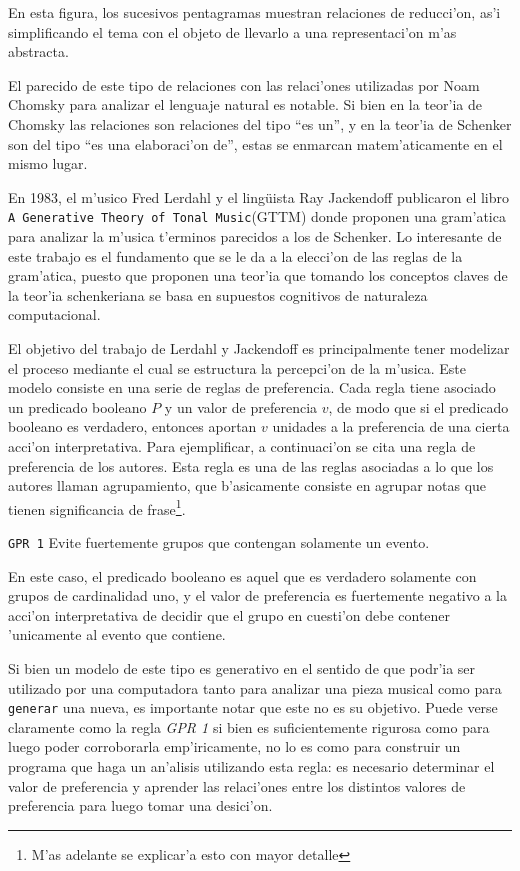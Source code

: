 En esta figura, los sucesivos pentagramas muestran relaciones de reducci'on, as'i simplificando el tema con el objeto de llevarlo a una representaci'on m'as abstracta.

El parecido de este tipo de relaciones con las relaci'ones utilizadas por Noam Chomsky para analizar el lenguaje natural es notable. 
Si bien en la teor'ia de Chomsky las relaciones son relaciones del tipo ``es un'', y en la teor'ia de Schenker son del tipo ``es una elaboraci'on de'', 
estas se enmarcan matem'aticamente en el mismo lugar.  

En 1983, el m'usico Fred Lerdahl y el ling\"uista Ray Jackendoff publicaron el libro 
\texttt{A Generative Theory of Tonal Music}(GTTM) donde proponen una gram'atica para analizar la m'usica t'erminos parecidos a los de Schenker. 
Lo interesante de este trabajo es el fundamento que se le da a la elecci'on de las reglas de la gram'atica, puesto que proponen una teor'ia que tomando los conceptos claves
de la teor'ia schenkeriana se basa en supuestos cognitivos de naturaleza computacional.

El objetivo del trabajo de Lerdahl y Jackendoff es principalmente tener modelizar el proceso mediante el cual se estructura la percepci'on de la m'usica. 
Este modelo consiste en una serie de reglas de preferencia. Cada regla tiene asociado un predicado booleano $P$ y un valor de preferencia $v$, 
de modo que si el predicado booleano es verdadero, entonces aportan $v$ unidades a la preferencia de una cierta acci'on interpretativa. Para ejemplificar, a continuaci'on se cita
una regla de preferencia de los autores. Esta regla es una de las reglas asociadas a lo que los autores llaman agrupamiento, que b'asicamente consiste en agrupar notas que tienen
significancia de frase\footnote{M'as adelante se explicar'a esto con mayor detalle}.
\newline

\begin{center}
\texttt{GPR 1} Evite fuertemente grupos que contengan solamente un evento.
\end{center}

En este caso, el predicado booleano es aquel que es verdadero solamente con grupos de cardinalidad uno, y el valor de preferencia es fuertemente negativo a la acci'on interpretativa
de decidir que el grupo en cuesti'on debe contener 'unicamente al evento que contiene. 

Si bien un modelo de este tipo es generativo en el sentido de que podr'ia ser utilizado por una computadora tanto para analizar una pieza musical como para 
\texttt{generar} una nueva, es importante notar que este no es su objetivo. 
Puede verse claramente como la regla \emph{GPR 1} si bien es suficientemente rigurosa como para luego poder corroborarla emp'iricamente, no lo es como para construir un 
programa que haga un an'alisis utilizando esta regla: es necesario determinar el valor de preferencia y aprender las relaci'ones entre los distintos valores de preferencia para luego 
tomar una desici'on.  

